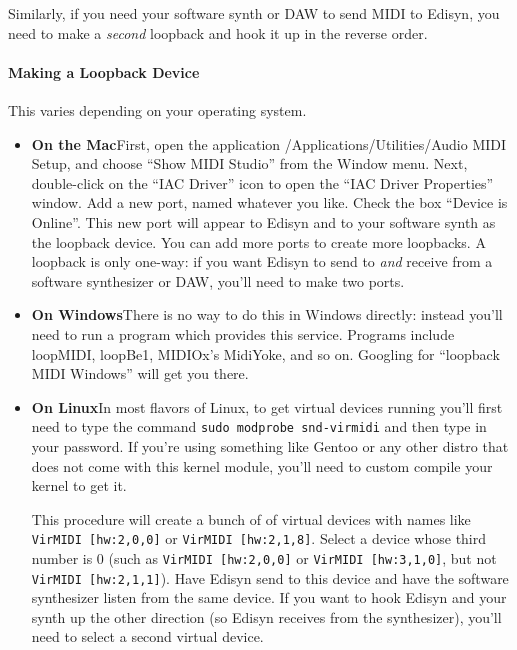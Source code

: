 \documentclass{article}
\begin{document}
Similarly, if you need your software synth or DAW to send MIDI to Edisyn, you need to make a {\it second} loopback and hook it up in the reverse order.

\paragraph{Making a Loopback Device}  This varies depending on your operating system.

\begin{itemize}
\item {\bf On the Mac}\quad First, open the application \textsf{/Applications/Utilities/Audio MIDI Setup}, and choose ``Show MIDI Studio'' from the Window menu. Next, double-click on the ``IAC Driver'' icon to open the ``IAC Driver Properties'' window.  Add a new port, named whatever you like.  Check the box ``Device is Online''.  This new port will appear to Edisyn and to your software synth as the loopback device.   You can add more ports to create more loopbacks.  A loopback is only one-way: if you want Edisyn to send to {\it and} receive from a software synthesizer or DAW, you'll need to make two ports.

\item {\bf On Windows}\quad There is no way to do this in Windows directly: instead you'll need to run a program which provides this service.  Programs include {\sf loopMIDI},  {\sf loopBe1}, MIDIOx's {\sf MidiYoke}, and so on.  Googling for ``loopback MIDI Windows'' will get you there. 

\item {\bf On Linux}\quad In most flavors of Linux, to get virtual devices running you'll first need to type the command \hbox{\tt sudo modprobe snd-virmidi} and then type in your password.  \quad If you're using something like Gentoo or any other distro that does not come with this kernel module, you'll need to custom compile your kernel to get it. 

This procedure will create a bunch of of virtual devices with names like {\tt VirMIDI [hw:2,0,0]} or {\tt VirMIDI [hw:2,1,8]}.  Select a device whose third number is 0 (such as {\tt VirMIDI [hw:2,0,0]} or {\tt VirMIDI [hw:3,1,0]}, but not {\tt VirMIDI [hw:2,1,1]}).  Have Edisyn send to this device and have the software synthesizer listen from the same device.  If you want to hook Edisyn and your synth up the other direction (so Edisyn receives from the synthesizer), you'll need to select a second virtual device.
\end{itemize}
\end{document}
